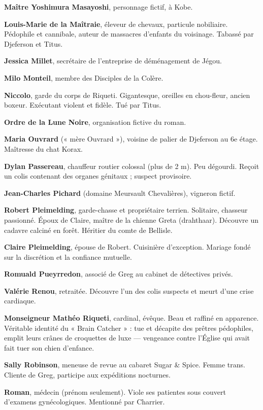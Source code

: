 \textbf{Maître Yoshimura Masayoshi}, personnage fictif, à Kobe.

\textbf{Louis-Marie de la Maîtraie}, éleveur de chevaux, particule nobiliaire. Pédophile et cannibale, auteur de massacres d'enfants du voisinage. Tabassé par Djeferson et Titus.

\textbf{Jessica Millet}, secrétaire de l'entreprise de déménagement de Jégou.

\textbf{Milo Monteil}, membre des Disciples de la Colère.

\textbf{Niccolo}, garde du corps de Riqueti. Gigantesque, oreilles en chou-fleur, ancien boxeur. Exécutant violent et fidèle. Tué par Titus.

\textbf{Ordre de la Lune Noire}, organisation fictive du roman.

\textbf{Maria Ouvrard} (« mère Ouvrard »), voisine de palier de Djeferson au 6e étage. Maîtresse du chat Korax.

\textbf{Dylan Passereau}, chauffeur routier colossal (plus de 2 m). Peu dégourdi. Reçoit un colis contenant des organes génitaux ; suspect provisoire.

\textbf{Jean-Charles Pichard} (domaine Meursault Chevalières), vigneron fictif.

\textbf{Robert Pleimelding}, garde-chasse et propriétaire terrien. Solitaire, chasseur passionné. Époux de Claire, maître de la chienne Greta (drahthaar). Découvre un cadavre calciné en forêt. Héritier du comte de Bellisle.

\textbf{Claire Pleimelding}, épouse de Robert. Cuisinière d'exception. Mariage fondé sur la discrétion et la confiance mutuelle.

\textbf{Romuald Pueyrredon}, associé de Greg au cabinet de détectives privés.

\textbf{Valérie Renou}, retraitée. Découvre l'un des colis suspects et meurt d'une crise cardiaque.

\textbf{Monseigneur Mathéo Riqueti}, cardinal, évêque. Beau et raffiné en apparence. Véritable identité du « Brain Catcher » : tue et décapite des prêtres pédophiles, emplit leurs crânes de croquettes de luxe --- vengeance contre l'Église qui avait fait tuer son chien d'enfance.

\textbf{Sally Robinson}, meneuse de revue au cabaret Sugar \& Spice. Femme trans. Cliente de Greg, participe aux expéditions nocturnes.

\textbf{Roman}, médecin (prénom seulement). Viole ses patientes sous couvert d'examens gynécologiques. Mentionné par Charrier.

